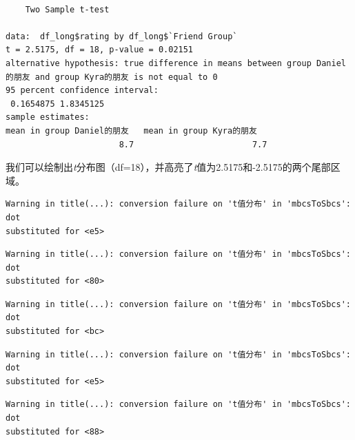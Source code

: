 \documentclass[
  letterpaper,
  DIV=11,
  numbers=noendperiod]{scrreprt}
\newenvironment{Shaded}{\begin{snugshade}}{\end{snugshade}}
\newcommand{\AttributeTok}[1]{\textcolor[rgb]{0.40,0.45,0.13}{#1}}
\newcommand{\ConstantTok}[1]{\textcolor[rgb]{0.56,0.35,0.01}{#1}}
\newcommand{\FunctionTok}[1]{\textcolor[rgb]{0.28,0.35,0.67}{#1}}
\newcommand{\NormalTok}[1]{\textcolor[rgb]{0.00,0.23,0.31}{#1}}
\newcommand{\SpecialCharTok}[1]{\textcolor[rgb]{0.37,0.37,0.37}{#1}}
\newcommand{\StringTok}[1]{\textcolor[rgb]{0.13,0.47,0.30}{#1}}
\begin{document}
\begin{Shaded}
\end{Shaded}

\begin{verbatim}

    Two Sample t-test

data:  df_long$rating by df_long$`Friend Group`
t = 2.5175, df = 18, p-value = 0.02151
alternative hypothesis: true difference in means between group Daniel的朋友 and group Kyra的朋友 is not equal to 0
95 percent confidence interval:
 0.1654875 1.8345125
sample estimates:
mean in group Daniel的朋友   mean in group Kyra的朋友 
                       8.7                        7.7 
\end{verbatim}

我们可以绘制出\emph{t}分布图（df=18），并高亮了\emph{t}值为2.5175和-2.5175的两个尾部区域。

\begin{verbatim}
Warning in title(...): conversion failure on 't值分布' in 'mbcsToSbcs': dot
substituted for <e5>
\end{verbatim}

\begin{verbatim}
Warning in title(...): conversion failure on 't值分布' in 'mbcsToSbcs': dot
substituted for <80>
\end{verbatim}

\begin{verbatim}
Warning in title(...): conversion failure on 't值分布' in 'mbcsToSbcs': dot
substituted for <bc>
\end{verbatim}

\begin{verbatim}
Warning in title(...): conversion failure on 't值分布' in 'mbcsToSbcs': dot
substituted for <e5>
\end{verbatim}

\begin{verbatim}
Warning in title(...): conversion failure on 't值分布' in 'mbcsToSbcs': dot
substituted for <88>
\end{verbatim}
\end{document}
